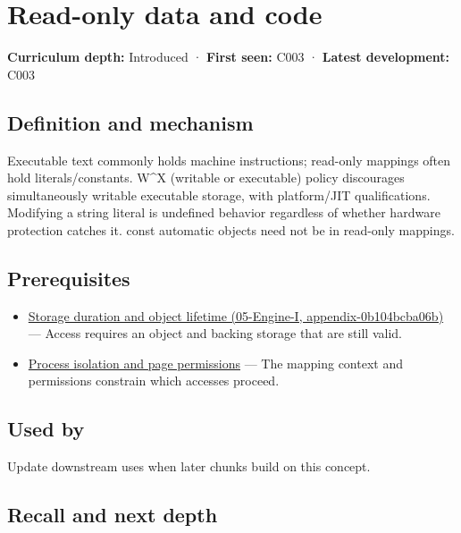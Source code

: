\hypertarget{appendix-5f9e5e2f0a5e}{}
\section{Read-only data and code}\label{appendix-5f9e5e2f0a5e-read-only-data-and-code}

\textbf{Curriculum depth:} Introduced · \textbf{First seen:} C003 · \textbf{Latest development:} C003

\subsection{Definition and mechanism}\label{appendix-5f9e5e2f0a5e-definition-and-mechanism}

Executable text commonly holds machine instructions; read-only mappings often hold literals/constants. W\^{}X (writable or executable) policy discourages simultaneously writable executable storage, with platform/JIT qualifications. Modifying a string literal is undefined behavior regardless of whether hardware protection catches it. const automatic objects need not be in read-only mappings.

\subsection{Prerequisites}\label{appendix-5f9e5e2f0a5e-prerequisites}

\begin{itemize}
\tightlist
\item
  \href{../05-Engine-I/main.pdf\#nameddest=appendix-0b104bcba06b}{Storage duration and object lifetime (05-Engine-I, appendix-0b104bcba06b)} --- Access requires an object and backing storage that are still valid.
\item
  \hyperref[appendix-c2a9ad1e2b49]{Process isolation and page permissions} --- The mapping context and permissions constrain which accesses proceed.
\end{itemize}

\subsection{Used by}\label{appendix-5f9e5e2f0a5e-used-by}

Update downstream uses when later chunks build on this concept.

\subsection{Recall and next depth}\label{appendix-5f9e5e2f0a5e-recall-and-next-depth}


